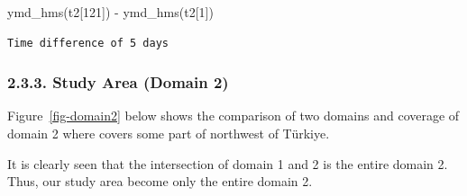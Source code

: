 \documentclass[
  letterpaper,
  DIV=11,
  numbers=noendperiod,
  abstract]{scrartcl}
\newenvironment{Shaded}{\begin{snugshade}}{\end{snugshade}}
\newcommand{\DecValTok}[1]{\textcolor[rgb]{0.68,0.00,0.00}{#1}}
\newcommand{\FunctionTok}[1]{\textcolor[rgb]{0.28,0.35,0.67}{#1}}
\newcommand{\NormalTok}[1]{\textcolor[rgb]{0.00,0.23,0.31}{#1}}
\newcommand{\SpecialCharTok}[1]{\textcolor[rgb]{0.37,0.37,0.37}{#1}}
\begin{document}
\begin{Shaded}
\begin{Highlighting}[]
\FunctionTok{ymd\_hms}\NormalTok{(t2[}\DecValTok{121}\NormalTok{]) }\SpecialCharTok{{-}} \FunctionTok{ymd\_hms}\NormalTok{(t2[}\DecValTok{1}\NormalTok{])}
\end{Highlighting}
\end{Shaded}

\begin{verbatim}
Time difference of 5 days
\end{verbatim}

\hypertarget{study-area-domain-2}{%
\subsubsection{2.3.3. Study Area (Domain 2)}\label{study-area-domain-2}}

Figure~\ref{fig-domain2} below shows the comparison of two domains and
coverage of domain 2 where covers some part of northwest of Türkiye.

It is clearly seen that the intersection of domain 1 and 2 is the entire
domain 2. Thus, our study area become only the entire domain 2.
\end{document}
